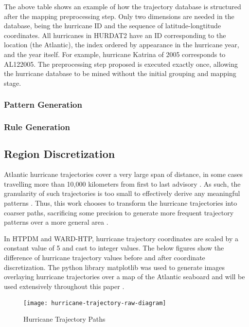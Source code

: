 \documentclass[12pt,conference]{IEEEtran}
\begin{document}
The above table shows an example of how the trajectory database is structured after the mapping preprocessing step. Only two dimensions are needed in the database, being the hurricane ID and the sequence of latitude-longtitude coordinates. All hurricanes in HURDAT2 have an ID corresponding to the location (the Atlantic), the index ordered by appearance in the hurricane year, and the year itself. For example, hurricane Katrina of 2005 corresponds to AL122005. The preprocessing step proposed is executed exactly once, allowing the hurricane database to be mined without the initial grouping and mapping stage.

\subsubsection{Pattern Generation}

\subsubsection{Rule Generation}



\subsection{Region Discretization}

Atlantic hurricane trajectories cover a very large span of distance, in some cases travelling more than 10,000 kilometers from first to last advisory \cite{hurricane-distances}. As such, the granularity of such trajectories is too small to effectively derive any meaningful patterns \cite{major-hurricane-model}. Thus, this work chooses to transform the hurricane trajectories into coarser paths, sacrificing some precision to generate more frequent trajectory patterns over a more general area \cite{ransform-hurricanes-for-discretization}. 

In HTPDM and WARD-HTP, hurricane trajectory coordinates are scaled by a constant value of 5 and cast to integer values. The below figures show the difference of hurricane trajectory values before and after coordinate discretization. The python library matplotlib was used to generate images overlaying hurricane trajectories over a map of the Atlantic seaboard and will be used extensively throughout this paper \cite{matplotlib}. 

\begin{figure}[h]
\caption{Hurricane Trajectory Paths}
\centering
\texttt{[image: hurricane-trajectory-raw-diagram]}
\end{figure}
\end{document}
